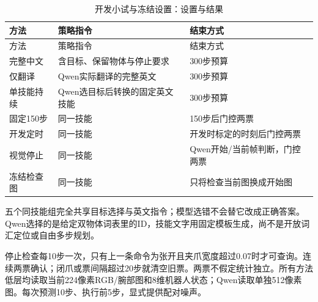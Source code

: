 \FloatBarrier\begingroup\small\setlength{\tabcolsep}{2.5pt}
\begin{longtable}[]{@{}
  >{\raggedright\arraybackslash}p{}
  >{\raggedright\arraybackslash}p{}
  >{\raggedright\arraybackslash}p{}@{}}
\caption{开发小试与冻结设置：设置与结果}\label{tab:s13-2}\tabularnewline
\toprule\noalign{}
\begin{minipage}[b]{\linewidth}\raggedright
方法
\end{minipage} & \begin{minipage}[b]{\linewidth}\raggedright
策略指令
\end{minipage} & \begin{minipage}[b]{\linewidth}\raggedright
结束方式
\end{minipage} \\
\midrule\noalign{}
\endfirsthead
\toprule\noalign{}
\begin{minipage}[b]{\linewidth}\raggedright
方法
\end{minipage} & \begin{minipage}[b]{\linewidth}\raggedright
策略指令
\end{minipage} & \begin{minipage}[b]{\linewidth}\raggedright
结束方式
\end{minipage} \\
\midrule\noalign{}
\endhead
\bottomrule\noalign{}
\endlastfoot
完整中文 & 含目标、保留物体与停止要求 & 300步预算 \\
仅翻译 & Qwen实际翻译的完整英文 & 300步预算 \\
单技能持续 & Qwen选目标后转换的固定英文技能 & 300步预算 \\
固定150步 & 同一技能 & 150步后门控两票 \\
开发定时 & 同一技能 & 开发时标定的时刻后门控两票 \\
视觉停止 & 同一技能 & Qwen开始/当前帧判断，门控两票 \\
冻结检查图 & 同一技能 & 只将检查当前图换成开始图 \\
\end{longtable}\endgroup

五个同技能组完全共享目标选择与英文指令；模型选错不会替它改成正确答案。Qwen选择的是给定双物体词表里的ID，技能文字用固定模板生成，尚不是开放词汇定位或自由多步规划。

停止检查每10步一次，只有上一条命令为张开且夹爪宽度超过0.07时才可查询。连续两票确认；闭爪或票间隔超过20步就清空旧票。两票不假定统计独立。所有方法低层均读取当前224像素RGB/腕部图和8维机器人状态；Qwen读取单独512像素图。每次预测10步、执行前5步，显式提供配对噪声。

